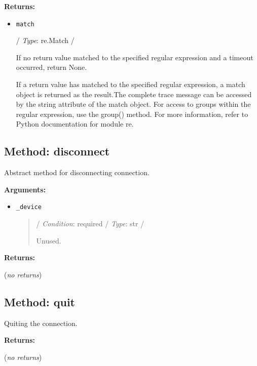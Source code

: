 \textbf{Returns:}

\begin{itemize}
\item
  \texttt{match}

  / \emph{Type}: re.Match /

  If no return value matched to the specified regular expression and a
  timeout occurred, return None.

  If a return value has matched to the specified regular expression, a
  match object is returned as the result.The complete trace message can
  be accessed by the \textquotesingle string\textquotesingle{} attribute
  of the match object. For access to groups within the regular
  expression, use the group() method. For more information, refer to
  Python documentation for module \textquotesingle re\textquotesingle.
\end{itemize}

\hypertarget{qconnectwinapp-winappdriver-winapp-client-winappclient-disconnect}{%
\subsection{Method: disconnect}\label{qconnectwinapp-winappdriver-winapp-client-winappclient-disconnect}}

Abstract method for disconnecting connection.

\textbf{Arguments:}

\begin{itemize}
\item
  \texttt{\_device}

  \begin{quote}
  / \emph{Condition}: required / \emph{Type}: str /

  Unused.
  \end{quote}
\end{itemize}

\textbf{Returns:}

(\emph{no returns})

\hypertarget{qconnectwinapp-winappdriver-winapp-client-winappclient-quit}{%
\subsection{Method: quit}\label{qconnectwinapp-winappdriver-winapp-client-winappclient-quit}}

Quiting the connection.

\textbf{Returns:}

(\emph{no returns})
